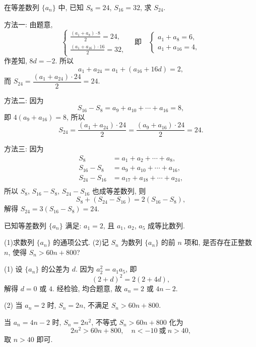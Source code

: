 \begin{example}
    在等差数列 $\{a_n\}$ 中, 已知 $S_8=24$, $S_{16}=32$, 求 $S_{24}$.
\end{example}
\beginsolution
    方法一: 由题意,
    \[\left\{\!\!\begin{array}{l}
        \frac{(a_1+a_8)\cdot 8}2= 24,\\
        \frac{(a_1+a_{16})\cdot 16}2= 32,
    \end{array}\right.\quad\text{即}\quad
    \left\{\!\!\begin{array}{l}
        a_1+a_8= 6,\\
        a_1+a_{16}= 4,
    \end{array}\right.\]
    作差知, $8d=-2$. 所以
    \[a_1+a_{24}= a_1+(a_{16}+16d)= 2,\]
    而 $S_{24}= \dfrac{(a_1+a_{24})\cdot 24}2= 24$.

    方法二: 因为
    \[S_{16}-S_8= a_9+a_{10}+\cdots +a_{16}= 8,\]
    即 $4(a_9+a_{16})= 8$, 所以
    \[S_{24}= \dfrac{(a_1+a_{24})\cdot 24}2
        =\dfrac{(a_9+a_{16})\cdot 24}2
        = 24.\]
    
    方法三: 因为
    \[\begin{aligned}
        S_8&= a_1+a_2+\cdots +a_8,\\
        S_{16}- S_8&= a_9+a_{10}+\cdots +a_{16},\\
        S_{24}- S_{16}&= a_{17}+a_{18}+\cdots +a_{24},\\
    \end{aligned}\]
    所以 $S_8$, $S_{16}- S_8$, $S_{24}- S_{16}$ 也成等差数列, 则
    \[S_8+ (S_{24}- S_{16})= 2(S_{16}- S_8),\]
    解得 $S_{24}= 3(S_{16}- S_8)= 24$.
\endsolution

\lianxi
\begin{exercise}[s]
    已知等差数列 $\{a_n\}$ 满足: $a_1=2$, 且 $a_1$, $a_2$, $a_5$ 成等比数列.
    
    (1)求数列 $\{a_n\}$ 的通项公式.\qquad   
    (2)记 $S_n$ 为数列 $\{a_n\}$ 的前 $n$ 项和, 是否存在正整数 $n$, 使得 $S_n>60n+800$?
\end{exercise}
\beginsolution
    (1) 设 $\{a_n\}$ 的公差为 $d$. 因为 $a_2^2= a_1a_5$, 即
    \[(2+d)^2= 2(2+4d),\]
    解得 $d=0$ 或 $4$. 经检验, 均合题意, 故 $a_n=2$ 或 $4n-2$.

    (2) 当 $a_n= 2$ 时, $S_n= 2n$, 不满足 $S_n>60n+800$.

    当 $a_n= 4n-2$ 时, $S_n= 2n^2$, 不等式 $S_n>60n+800$ 化为
    \[2n^2> 60n+800,\quad n<-10\ \text{或}\ n>40,\]
    取 $n>40$ 即可.
\endsolution

